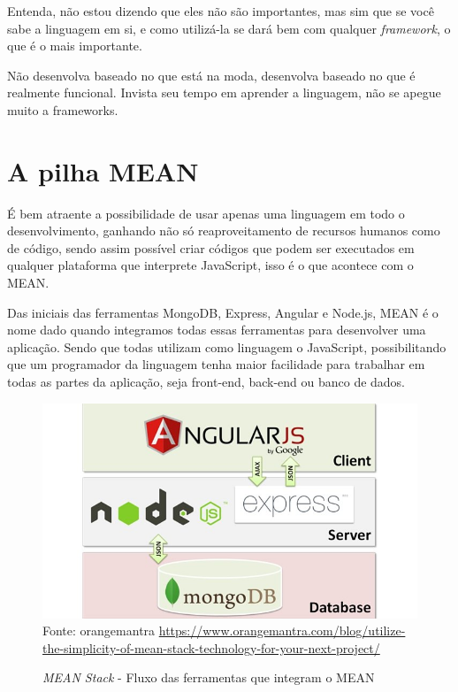 \documentclass[
	12pt,				%
	openright,			%
	twoside,			%
	a4paper,			%
	english,			%
	brazil				%
	]{abntex2}
\begin{document}
Entenda, não estou dizendo que eles não são importantes, mas sim que se você sabe a linguagem em si, e como utilizá-la se dará bem com qualquer \textit{framework}, o que é o mais importante.

Não desenvolva baseado no que está na moda, desenvolva baseado no que é realmente funcional. Invista seu tempo em aprender a linguagem, não se apegue muito a frameworks. 
\chapter{A pilha MEAN}

É bem atraente a possibilidade de usar apenas uma linguagem em todo o desenvolvimento, ganhando não só reaproveitamento de recursos humanos como de código, sendo assim possível criar códigos que podem ser executados em qualquer plataforma que interprete JavaScript, isso é o que acontece com o MEAN.

Das iniciais das ferramentas MongoDB, Express, Angular e Node.js, MEAN é o nome dado quando integramos todas essas ferramentas para desenvolver uma aplicação. Sendo que todas utilizam como linguagem o JavaScript, possibilitando que um programador da linguagem tenha maior facilidade para trabalhar em todas as partes da aplicação, seja front-end, back-end ou banco de dados.

\begin{figure}[h]
	\centering

	\caption{\textit{MEAN Stack} - Fluxo das ferramentas que integram o MEAN} \label{fig:MEANStackFlow}
    \includegraphics[scale=0.5]{mean-stack-flow} \\
    Fonte: {orangemantra \url{https://www.orangemantra.com/blog/utilize-the-simplicity-of-mean-stack-technology-for-your-next-project/}}

\end{figure}
\end{document}
